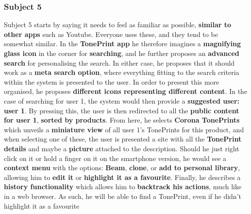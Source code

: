 \subsubsection{Subject 5}
\label{Subject5}
Subject 5 starts by saying it needs to feel as familiar as possible, \textbf{similar to other apps} such as Youtube. Everyone uses these, and they tend to be somewhat similar. In the \textbf{TonePrint app} he therefore imagines a \textbf{magnifying glass icon} in the corner for \textbf{searching}, and he further proposes an \textbf{advanced search} for personalising the search. In either case, he proposes that it should work as a \textbf{meta search option}, where everything fitting to the search criteria within the system is presented to the user. In order to present this more organised, he proposes \textbf{different icons representing different content}. In the case of searching for user 1, the system would then provide a \textbf{suggested user: user 1}. By pressing this, the user is then redirected to all the \textbf{public content for user 1}, \textbf{sorted by products}. From here, he selects \textbf{Corona TonePrints} which unveils a \textbf{miniature view} of all user 1's TonePrints for this product, and when selecting one of these, the user is presented a site with all the \textbf{TonePrint details} and maybe a \textbf{picture} attached to the description. Should he just right click on it or hold a finger on it on the smartphone version, he would see a \textbf{context menu} with the options: \textbf{Beam}, \textbf{clone}, or \textbf{add to personal library}, allowing him to \textbf{edit it} or \textbf{highlight it as a favourite}. Finally, he describes a \textbf{history functionality} which allows him to \textbf{backtrack his actions}, much like in a web browser. As such, he will be able to find a TonePrint, even if he didn't highlight it as a favourite \\
%
\newpage
%
